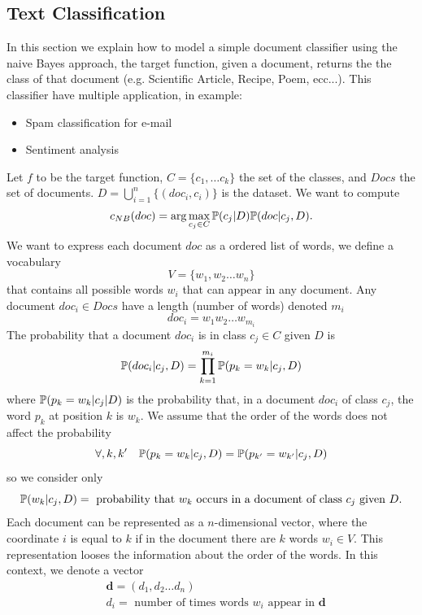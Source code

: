 \documentclass[10pt, letterpaper]{report}
\begin{document}
\subsection{Text Classification}
In this section we explain how to model a simple document classifier using the naive Bayes approach, the target function, given a document, returns the the class of that document (e.g. Scientific Article, Recipe, Poem, ecc...). This classifier have multiple application, in example:\begin{itemize}
	\item Spam classification for e-mail
	\item Sentiment analysis
\end{itemize}
Let $f$ to be the target function, $C=\{c_1,\dots c_k\}$ the set of the classes, and $Docs$ the set of documents. $D=\bigcup_{i=1}^n\{(doc_i,c_i)\}$ is the dataset. We want to compute\begin{equation}
	c_{NB}(doc)=\arg\max_{c_j\in C}{\mathbb P}(c_j|D){\mathbb P}(doc|c_j,D).
\end{equation}
We want to express each document $doc$ as a ordered list of words, we define a vocabulary\begin{equation}
	V=\{w_1,w_2\dots w_n\}
\end{equation}
that contains all possible words $w_i$ that can appear in any document. Any document $doc_i\in Docs$ have a length (number of words) denoted $m_i$\begin{equation}
	doc_i=w_1w_2\dots w_{m_i}
\end{equation}
The probability that a document $doc_i$ is in class $c_j\in C$ given $D$ is\begin{equation}
	{\mathbb P}(doc_i|c_j,D)=\prod_{k=1}^{m_i}{\mathbb P}(p_k=w_k|c_j,D)
\end{equation}
where ${\mathbb P}(p_k=w_k|c_j|D)$ is the probability that, in a document $doc_i$ of class $c_j$, the word $p_k$ at position $k$ is $w_k$. We assume that the order of the words does not affect the probability\begin{equation}
	\forall,k,k' \ \ \ \Prob(p_k=w_k|c_j,D)=\Prob(p_{k'}=w_{k'}|c_j,D)
\end{equation}
so we consider only \begin{equation}
	{\mathbb P}(w_k|c_j,D)=\text{ probability that $w_k$ occurs in a document of class $c_j$ given $D$}.
\end{equation}
Each document can be represented as a $n$-dimensional vector, where the coordinate $i$ is equal to $k$ if in the document there are $k$ words $w_i\in V$. This representation looses the information about the order of the words. In this context, we denote a vector \begin{align}
	 & \mathbf d = (d_1,d_2\dots d_n) \\ &d_i = \text{ number of times words $w_i$ appear in $\mathbf d$}
\end{align}
\end{document}
